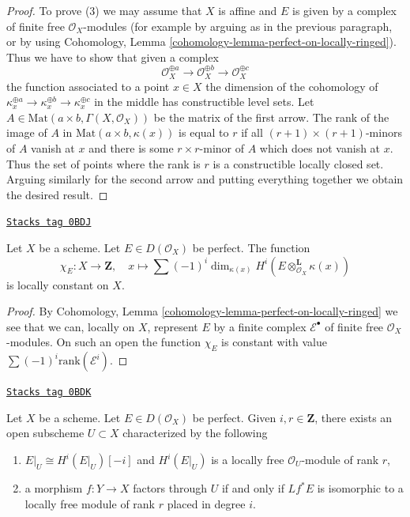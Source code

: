 \begin{proof}
\medskip\noindent
To prove (3) we may assume that $X$ is affine and
$E$ is given by a complex of finite
free $\mathcal{O}_X$-modules (for example by arguing as in the previous
paragraph, or by using Cohomology, Lemma
\ref{cohomology-lemma-perfect-on-locally-ringed}).
Thus we have to show that given a complex
$$
\mathcal{O}_X^{\oplus a} \to
\mathcal{O}_X^{\oplus b} \to
\mathcal{O}_X^{\oplus c}
$$
the function associated to a point $x \in X$ the dimension of the cohomology
of $\kappa_x^{\oplus a} \to \kappa_x^{\oplus b} \to \kappa_x^{\oplus c}$
in the middle has constructible level sets. Let
$A \in \text{Mat}(a \times b, \Gamma(X, \mathcal{O}_X))$ be the matrix
of the first arrow. The rank of the image of $A$ in
$\text{Mat}(a \times b, \kappa(x))$ is equal to $r$ if all
$(r + 1) \times (r + 1)$-minors of $A$ vanish at $x$ and there is some
$r \times r$-minor of $A$ which does not vanish at $x$. Thus the set
of points where the rank is $r$ is a constructible locally closed set.
Arguing similarly for the second arrow and putting everything together
we obtain the desired result.
\end{proof}

\begin{lemma}
\label{perfect-lemma-chi-locally-constant}
\href{https://stacks.math.columbia.edu/tag/0BDJ}{\texttt{Stacks tag 0BDJ}}

Let $X$ be a scheme. Let $E \in D(\mathcal{O}_X)$ be perfect.
The function
$$
\chi_E : X \longrightarrow \mathbf{Z},\quad
x \longmapsto \sum (-1)^i
\dim_{\kappa(x)} H^i(E \otimes_{\mathcal{O}_X}^\mathbf{L} \kappa(x))
$$
is locally constant on $X$.
\end{lemma}

\begin{proof}
By Cohomology, Lemma
\ref{cohomology-lemma-perfect-on-locally-ringed}
we see that we can, locally on $X$, represent $E$ by a finite
complex $\mathcal{E}^\bullet$ of finite free $\mathcal{O}_X$-modules.
On such an open the function $\chi_E$ is constant with value
$\sum (-1)^i \text{rank}(\mathcal{E}^i)$.
\end{proof}

\begin{lemma}
\label{perfect-lemma-open-where-cohomology-in-degree-i-rank-r}
\href{https://stacks.math.columbia.edu/tag/0BDK}{\texttt{Stacks tag 0BDK}}

Let $X$ be a scheme. Let $E \in D(\mathcal{O}_X)$ be perfect.
Given $i, r \in \mathbf{Z}$, there exists an
open subscheme $U \subset X$ characterized by the following
\begin{enumerate}
\item $E|_U \cong H^i(E|_U)[-i]$ and $H^i(E|_U)$ is a locally free
$\mathcal{O}_U$-module of rank $r$,
\item a morphism $f : Y \to X$ factors through $U$ if and only if
$Lf^*E$ is isomorphic to a locally free module of rank $r$
placed in degree $i$.
\end{enumerate}
\end{lemma}

